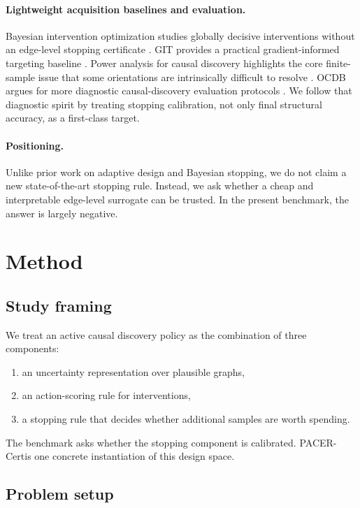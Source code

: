 \documentclass{article}
\newcommand{\method}{PACER-Cert}
\begin{document}
\paragraph{Lightweight acquisition baselines and evaluation.}
Bayesian intervention optimization studies globally decisive interventions without an edge-level stopping certificate \citep{wang2024bio}. GIT provides a practical gradient-informed targeting baseline \citep{olko2023git}. Power analysis for causal discovery highlights the core finite-sample issue that some orientations are intrinsically difficult to resolve \citep{kummerfeld2024power}. OCDB argues for more diagnostic causal-discovery evaluation protocols \citep{zhou2024ocdb}. We follow that diagnostic spirit by treating stopping calibration, not only final structural accuracy, as a first-class target.

\paragraph{Positioning.}
Unlike prior work on adaptive design and Bayesian stopping, we do not claim a new state-of-the-art stopping rule. Instead, we ask whether a cheap and interpretable edge-level surrogate can be trusted. In the present benchmark, the answer is largely negative.

\section{Method}
\label{sec:method}

\subsection{Study framing}

We treat an active causal discovery policy as the combination of three components:
\begin{enumerate}
  \item an uncertainty representation over plausible graphs,
  \item an action-scoring rule for interventions,
  \item a stopping rule that decides whether additional samples are worth spending.
\end{enumerate}
The benchmark asks whether the stopping component is calibrated. \method is one concrete instantiation of this design space.

\subsection{Problem setup}
\end{document}
